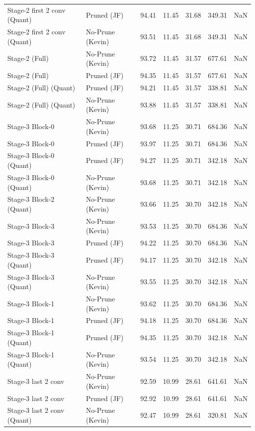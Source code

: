 \begin{table}
\begin{tabular}{llrrrrl}
Stage-2 first 2 conv
(Quant) & Pruned (JF) & 94.41 & 11.45 & 31.68 & 349.31 & NaN \\
Stage-2 first 2 conv
(Quant) & No-Prune (Kevin) & 93.51 & 11.45 & 31.68 & 349.31 & NaN \\
Stage-2 (Full) & No-Prune (Kevin) & 93.72 & 11.45 & 31.57 & 677.61 & NaN \\
Stage-2 (Full) & Pruned (JF) & 94.35 & 11.45 & 31.57 & 677.61 & NaN \\
Stage-2 (Full)
(Quant) & Pruned (JF) & 94.21 & 11.45 & 31.57 & 338.81 & NaN \\
Stage-2 (Full)
(Quant) & No-Prune (Kevin) & 93.88 & 11.45 & 31.57 & 338.81 & NaN \\
Stage-3 Block-0 & No-Prune (Kevin) & 93.68 & 11.25 & 30.71 & 684.36 & NaN \\
Stage-3 Block-0 & Pruned (JF) & 93.97 & 11.25 & 30.71 & 684.36 & NaN \\
Stage-3 Block-0
(Quant) & Pruned (JF) & 94.27 & 11.25 & 30.71 & 342.18 & NaN \\
Stage-3 Block-0
(Quant) & No-Prune (Kevin) & 93.68 & 11.25 & 30.71 & 342.18 & NaN \\
Stage-3 Block-2
(Quant) & No-Prune (Kevin) & 93.66 & 11.25 & 30.70 & 342.18 & NaN \\
Stage-3 Block-3 & No-Prune (Kevin) & 93.53 & 11.25 & 30.70 & 684.36 & NaN \\
Stage-3 Block-3 & Pruned (JF) & 94.22 & 11.25 & 30.70 & 684.36 & NaN \\
Stage-3 Block-3
(Quant) & Pruned (JF) & 94.17 & 11.25 & 30.70 & 342.18 & NaN \\
Stage-3 Block-3
(Quant) & No-Prune (Kevin) & 93.55 & 11.25 & 30.70 & 342.18 & NaN \\
Stage-3 Block-1 & No-Prune (Kevin) & 93.62 & 11.25 & 30.70 & 684.36 & NaN \\
Stage-3 Block-1 & Pruned (JF) & 94.18 & 11.25 & 30.70 & 684.36 & NaN \\
Stage-3 Block-1
(Quant) & Pruned (JF) & 94.35 & 11.25 & 30.70 & 342.18 & NaN \\
Stage-3 Block-1
(Quant) & No-Prune (Kevin) & 93.54 & 11.25 & 30.70 & 342.18 & NaN \\
Stage-3 last 2 conv & No-Prune (Kevin) & 92.59 & 10.99 & 28.61 & 641.61 & NaN \\
Stage-3 last 2 conv & Pruned (JF) & 92.92 & 10.99 & 28.61 & 641.61 & NaN \\
Stage-3 last 2 conv
(Quant) & No-Prune (Kevin) & 92.47 & 10.99 & 28.61 & 320.81 & NaN \\

\end{tabular}
\end{table}
